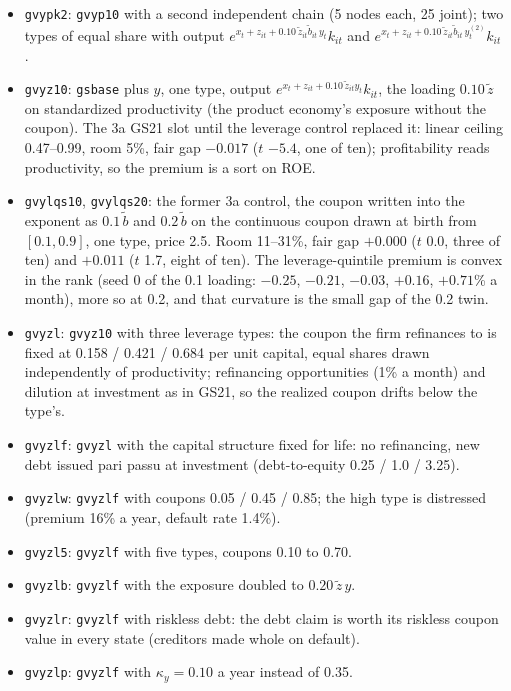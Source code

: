 \documentclass[11pt]{article}
\begin{document}
\begin{itemize}
\item \texttt{gvypk2}: \texttt{gvyp10} with a second independent chain (5 nodes each, 25 joint); two types of equal share with output $e^{x_t+z_{it}+0.10\,\tilde z_{it}\tilde b_{it}\,y_t}k_{it}$ and $e^{x_t+z_{it}+0.10\,\tilde z_{it}\tilde b_{it}\,y^{(2)}_t}k_{it}$.
\item \texttt{gvyz10}: \texttt{gsbase} plus $y$, one type, output $e^{x_t+z_{it}+0.10\,\tilde z_{it} y_t} k_{it}$, the loading $0.10\,\tilde z$ on standardized productivity (the product economy's exposure without the coupon). The 3a GS21 slot until the leverage control replaced it: linear ceiling 0.47--0.99, room 5\%, fair gap $-0.017$ ($t$ $-5.4$, one of ten); profitability reads productivity, so the premium is a sort on ROE.
\item \texttt{gvylqs10}, \texttt{gvylqs20}: the former 3a control, the coupon written into the exponent as $0.1\,\tilde b$ and $0.2\,\tilde b$ on the continuous coupon drawn at birth from $[0.1, 0.9]$, one type, price 2.5. Room 11--31\%, fair gap $+0.000$ ($t$ 0.0, three of ten) and $+0.011$ ($t$ 1.7, eight of ten). The leverage-quintile premium is convex in the rank (seed 0 of the 0.1 loading: $-0.25$, $-0.21$, $-0.03$, $+0.16$, $+0.71$\% a month), more so at 0.2, and that curvature is the small gap of the 0.2 twin.
\item \texttt{gvyzl}: \texttt{gvyz10} with three leverage types: the coupon the firm refinances to is fixed at 0.158 / 0.421 / 0.684 per unit capital, equal shares drawn independently of productivity; refinancing opportunities (1\% a month) and dilution at investment as in GS21, so the realized coupon drifts below the type's.
\item \texttt{gvyzlf}: \texttt{gvyzl} with the capital structure fixed for life: no refinancing, new debt issued pari passu at investment (debt-to-equity 0.25 / 1.0 / 3.25).
\item \texttt{gvyzlw}: \texttt{gvyzlf} with coupons 0.05 / 0.45 / 0.85; the high type is distressed (premium 16\% a year, default rate 1.4\%).
\item \texttt{gvyzl5}: \texttt{gvyzlf} with five types, coupons 0.10 to 0.70.
\item \texttt{gvyzlb}: \texttt{gvyzlf} with the exposure doubled to $0.20\,\tilde z\,y$.
\item \texttt{gvyzlr}: \texttt{gvyzlf} with riskless debt: the debt claim is worth its riskless coupon value in every state (creditors made whole on default).
\item \texttt{gvyzlp}: \texttt{gvyzlf} with $\kappa_y=0.10$ a year instead of 0.35.

\end{itemize}
\end{document}
